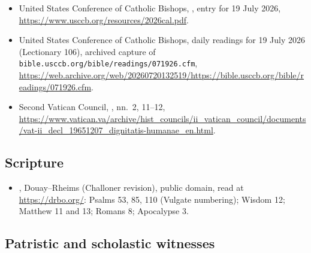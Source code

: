 \begin{itemize}
  \url{https://www.liturgyoffice.org.uk/Resources/GIRM/Documents/GNLY.pdf}.
\item United States Conference of Catholic Bishops, , entry for 19 July 2026,
  \url{https://www.usccb.org/resources/2026cal.pdf}.
\item United States Conference of Catholic Bishops, daily readings for
  19 July 2026 (Lectionary 106), archived capture of
  \texttt{bible.usccb.org/bible/readings/071926.cfm},
  \url{https://web.archive.org/web/20260720132519/https://bible.usccb.org/bible/readings/071926.cfm}.
\item Second Vatican Council, , nn.\ 2, 11--12,
  \url{https://www.vatican.va/archive/hist_councils/ii_vatican_council/documents/vat-ii_decl_19651207_dignitatis-humanae_en.html}.
\end{itemize}

\subsection*{Scripture}

\begin{itemize}
\item {}, Douay--Rheims (Challoner revision), public domain,
  read at \url{https://drbo.org/}: Psalms 53, 85, 110 (Vulgate numbering);
  Wisdom 12; Matthew 11 and 13; Romans 8; Apocalypse 3.
\end{itemize}

\subsection*{Patristic and scholastic witnesses}

